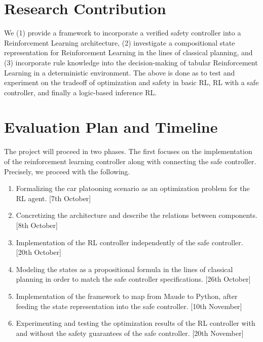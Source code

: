 \documentclass[a4paper,11pt]{article}
\begin{document}
\section{Research Contribution}
We (1) provide a framework to incorporate a verified safety controller into a Reinforcement Learning architecture, 
(2) investigate a compositional state representation for Reinforcement Learning in the lines of classical planning, 
and (3) incorporate rule knowledge into the decision-making of tabular Reinforcement Learning in a deterministic environment. 
The above is done as to test and experiment on the tradeoff of optimization and safety in basic RL, RL with a safe controller, 
and finally a logic-based inference RL.


\section{Evaluation Plan and Timeline}
The project will proceed in two phases. The first focuses on the implementation of the reinforcement learning controller along with 
connecting the safe controller. Precisely, we proceed with the following. 
\begin{enumerate}
  \item Formalizing the car platooning scenario as an optimization problem for the RL agent. [7th October] 
  \item Concretizing the architecture and describe the relations between components. [8th October]
  \item Implementation of the RL controller independently of the safe controller. [20th October]
  \item Modeling the states as a propositional formula in the lines of classical planning in order to match the safe controller specifications. [26th October]
  \item Implementation of the framework to map from Maude to Python, after feeding the state representation into the safe controller. [10th November]
  \item Experimenting and testing the optimization results of the RL controller with and without the safety guarantees of the safe controller. [20th November]
\end{enumerate}
\end{document}
